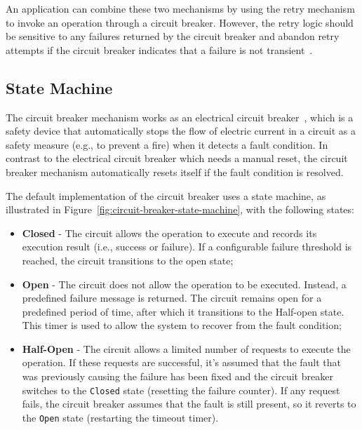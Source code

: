An application can combine these two mechanisms by using the retry mechanism to invoke an operation through a circuit breaker.
However,
the retry logic should be sensitive to any failures returned by the circuit breaker
and abandon retry attempts
if the circuit breaker indicates that a failure is not transient~\cite{microsoft-cbreaker-pattern}.

\subsection{State Machine}\label{subsec:cbreaker-state-machine}

The circuit breaker mechanism works as an electrical circuit breaker~\cite{electrical-circuit-breaker},
which is a safety device that automatically stops the flow of electric current in a circuit as a safety measure
(e.g., to prevent a fire) when it detects a fault condition.
In contrast to the electrical circuit breaker which needs a manual reset,
the circuit breaker mechanism automatically resets itself if the fault condition is resolved.

The default implementation of the circuit breaker uses a state machine,
as illustrated in Figure~\ref{fig:circuit-breaker-state-machine}, with the following states:

\begin{itemize}
    \item \textbf{Closed} - The circuit allows the operation to execute and records its execution result
    (i.e., success or failure).
    If a configurable failure threshold is reached, the circuit transitions to the open state;
    \item \textbf{Open} - The circuit does not allow the operation to be executed.
    Instead, a predefined failure message is returned.
    The circuit remains open for a predefined period of time, after which it transitions to the Half-open state.
    This timer is used to allow the system to recover from the fault condition;
    \item \textbf{Half-Open} - The circuit allows a limited number of requests to execute the operation.
    If these requests are successful,
    it's assumed that the fault
    that was previously causing the failure has been fixed and the circuit breaker switches to the \texttt{Closed} state
    (resetting the failure counter).
    If any request fails,
    the circuit breaker assumes that the fault is still present,
    so it reverts to the \texttt{Open} state (restarting the timeout timer).
\end{itemize}

